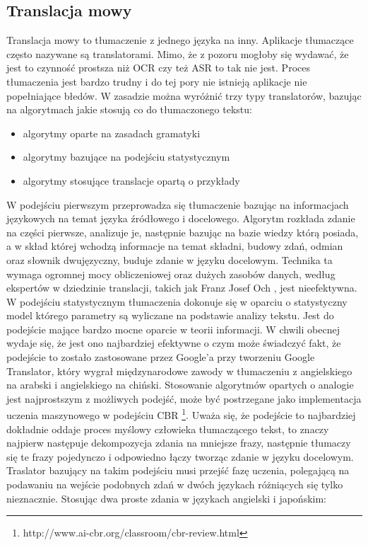 \subsection{Translacja mowy}
Translacja mowy to tłumaczenie z jednego języka na inny. Aplikacje tłumaczące często nazywane są translatorami. Mimo, że z pozoru mogłoby się wydawać, że jest to czynność prostsza niż OCR czy też ASR to tak nie jest. Proces tłumaczenia jest bardzo trudny i do tej pory nie istnieją aplikacje nie popełniające błedów. W zasadzie można wyróżnić trzy typy translatorów, bazując na algorytmach jakie stosują co do tłumaczonego tekstu:
\begin{itemize}
	\item algorytmy oparte na zasadach gramatyki
	\item algorytmy bazujące na podejściu statystycznym
	\item algorytmy stosujące translacje opartą o przykłady
\end{itemize}
W podejściu pierwszym przeprowadza się tłumaczenie bazując na informacjach językowych na temat języka źródłowego i docelowego. Algorytm rozkłada zdanie na części pierwsze, analizuje je, następnie bazując na bazie wiedzy którą posiada, a w skład której wchodzą informacje na temat składni, budowy zdań, odmian oraz słownik dwujęzyczny, buduje zdanie w języku docelowym. Technika ta wymaga ogromnej mocy obliczeniowej oraz dużych zasobów danych, według ekspertów w dziedzinie translacji, takich jak Franz Josef Och \cite{och2003}, jest nieefektywna.
W podejściu statystycznym tłumaczenia dokonuje się w oparciu o statystyczny model którego parametry są wyliczane na podstawie analizy tekstu. Jest do podejście mające bardzo mocne oparcie w teorii informacji. W chwili obecnej wydaje się, że jest ono najbardziej efektywne o czym może świadczyć fakt, że podejście to zostało zastosowane przez Google'a przy tworzeniu Google Translator, który wygrał międzynarodowe zawody w tłumaczeniu z angielskiego na arabski i angielskiego na chiński.
Stosowanie algorytmów opartych o analogie jest najprostszym z możliwych podejść, może być postrzegane jako implementacja uczenia maszynowego w podejściu CBR \footnote{http://www.ai-cbr.org/classroom/cbr-review.html}. Uważa się, że podejście to najbardziej dokładnie oddaje proces myślowy człowieka tłumaczącego tekst, to znaczy najpierw następuje dekompozycja zdania na mniejsze frazy, następnie tłumaczy się te frazy pojedynczo i odpowiedno łączy tworząc zdanie w języku docelowym. Traslator bazujący na takim podejściu musi przejść fazę uczenia, polegającą na podawaniu na wejście podobnych zdań w dwóch językach różniących się tylko nieznacznie. Stosując dwa proste zdania w językach angielski i japońskim: 
